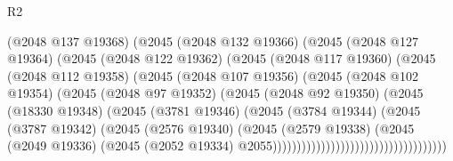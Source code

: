 \begin{lexlean}{R2}
\begin{coremodule}
                                          (@2048 @137 @19368)
                                          (@2045
                                            (@2048 @132 @19366)
                                            (@2045
                                              (@2048 @127 @19364)
                                              (@2045
                                                (@2048 @122 @19362)
                                                (@2045
                                                  (@2048 @117 @19360)
                                                  (@2045
                                                    (@2048 @112 @19358)
                                                    (@2045
                                                      (@2048 @107 @19356)
                                                      (@2045
                                                        (@2048 @102 @19354)
                                                        (@2045
                                                          (@2048 @97 @19352)
                                                          (@2045
                                                            (@2048 @92 @19350)
                                                            (@2045
                                                              (@18330 @19348)
                                                              (@2045
                                                                (@3781 @19346)
                                                                (@2045
                                                                  (@3784 @19344)
                                                                  (@2045
                                                                    (@3787 @19342)
                                                                    (@2045
                                                                      (@2576 @19340)
                                                                      (@2045
                                                                        (@2579 @19338)
                                                                        (@2045
                                                                          (@2049 @19336)
                                                                          (@2045
                                                                            (@2052 @19334)
                                                                            @2055))))))))))))))))))))))))))))))))))))

\end{coremodule}
\end{lexlean}
